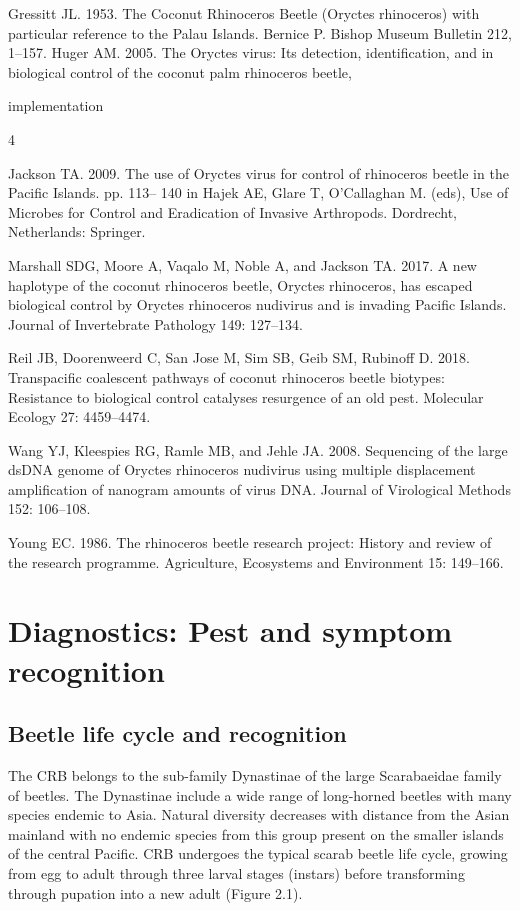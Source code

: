 \documentclass[twocolumn,letterpaper]{scrartcl}
\begin{document}
Gressitt JL. 1953. The Coconut Rhinoceros Beetle (Oryctes 
rhinoceros)  with  particular  reference  to  the  Palau 
Islands. Bernice P. Bishop Museum Bulletin 212, 1–157.
Huger  AM.  2005.  The  Oryctes  virus:  Its  detection, 
identification,  and 
in  biological 
control  of  the  coconut  palm  rhinoceros  beetle, 

implementation 

4

Jackson  TA.  2009.  The  use  of  Oryctes  virus  for  control 
of  rhinoceros  beetle  in  the  Pacific  Islands.  pp.  113–
140  in  Hajek  AE,  Glare  T,  O’Callaghan  M.  (eds),  Use 
of  Microbes  for  Control  and  Eradication  of  Invasive 
Arthropods. Dordrecht, Netherlands: Springer.

Marshall  SDG,  Moore  A,  Vaqalo  M,  Noble  A,  and 
Jackson  TA.  2017.  A  new  haplotype  of  the  coconut 
rhinoceros  beetle,  Oryctes  rhinoceros,  has  escaped 
biological control by Oryctes rhinoceros nudivirus and 
is  invading  Pacific  Islands.  Journal  of  Invertebrate 
Pathology 149: 127–134.

Reil JB, Doorenweerd C, San Jose M, Sim SB, Geib SM, 
Rubinoff  D.  2018.  Transpacific  coalescent  pathways 
of  coconut  rhinoceros  beetle  biotypes:  Resistance 
to biological control catalyses resurgence of an old 
pest. Molecular Ecology 27: 4459–4474.

Wang YJ, Kleespies RG, Ramle MB, and Jehle JA. 2008. 
Sequencing  of  the  large  dsDNA  genome  of Oryctes 
rhinoceros  nudivirus  using  multiple  displacement 
amplification  of  nanogram  amounts  of  virus  DNA. 
Journal of Virological Methods 152: 106–108.

Young EC. 1986. The rhinoceros beetle research project: 
History  and  review  of  the  research  programme. 
Agriculture, Ecosystems and Environment 15: 149–166.

\section{Diagnostics: Pest and symptom recognition} 

\subsection{Beetle life cycle and recognition}

The CRB belongs to the sub-family Dynastinae of the large Scarabaeidae family of beetles. The Dynastinae 
include a wide range of long-horned beetles with many species endemic to Asia. Natural diversity decreases 
with distance from the Asian mainland with no endemic species from this group present on the smaller islands 
of the central Pacific. CRB undergoes the typical scarab beetle life cycle, growing from egg to adult through 
three larval stages (instars) before transforming through pupation into a new adult (Figure 2.1). 
\end{document}
